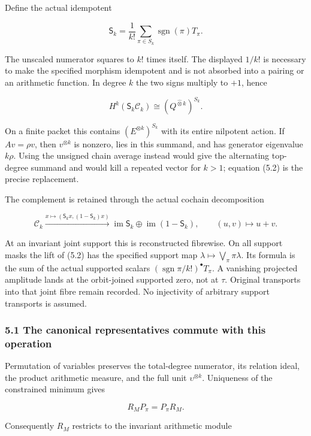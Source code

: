 Define the actual idempotent

\[\boxed{\mathsf S_k=\frac1{k!}\sum_{\pi\in S_k}\operatorname{sgn}(\pi)T_\pi.}\tag{5.2}\]

The unscaled numerator squares to \(k!\) times itself. The displayed
\(1/k!\) is necessary to make the specified morphism idempotent and is
not absorbed into a pairing or an arithmetic function. In degree \(k\)
the two signs multiply to \(+1\), hence

\[\boxed{H^k(\mathsf S_k\mathcal C_k)\cong
(Q^{\widehat\otimes k})^{S_k}.}\tag{5.3}\]

On a finite packet this contains \((E^{\otimes k})^{S_k}\) with its
entire nilpotent action. If \(Av=\rho v\), then \(v^{\otimes k}\) is
nonzero, lies in this summand, and has generator eigenvalue \(k\rho\).
Using the unsigned chain average instead would give the alternating
top-degree summand and would kill a repeated vector for \(k>1\);
equation (5.2) is the precise replacement.

The complement is retained through the actual cochain decomposition

\[\mathcal C_k\xrightarrow{x\mapsto(\mathsf S_kx,(1-\mathsf S_k)x)}
\operatorname{im}\mathsf S_k\oplus\operatorname{im}(1-\mathsf S_k),\qquad (u,v)\mapsto u+v.\tag{5.4}\]

At an invariant joint support this is reconstructed fibrewise. On all
support masks the lift of (5.2) has the specified support map
\(\lambda\mapsto\bigvee_\pi\pi\lambda\). Its formula is the sum of the
actual supported scalars \((\operatorname{sgn}\pi/k!)^\bullet T_\pi\). A
vanishing projected amplitude lands at the orbit-joined supported zero,
not at \(\tau\). Original transports into that joint fibre remain
recorded. No injectivity of arbitrary support transports is assumed.

\subsubsection{5.1 The canonical representatives commute with this
operation}\label{symmetric_frontier:the-canonical-representatives-commute-with-this-operation}

Permutation of variables preserves the total-degree numerator, its
relation ideal, the product arithmetic measure, and the full unit
\(\upsilon^{\otimes k}\). Uniqueness of the constrained minimum gives

\[R_MP_\pi=P_\pi R_M.\tag{5.5}\]

Consequently \(R_M\) restricts to the invariant arithmetic module

